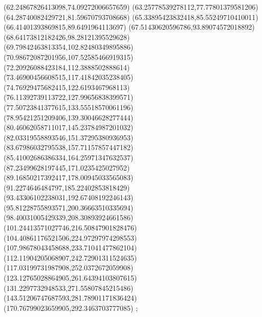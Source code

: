 {(62.24867826413098,74.09272006657659)
(63.25778539278112,77.77801379581206)
(64.28740082429721,81.59670793708668)
(65.33895423832418,85.55249710410011)
(66.41401393869815,89.6491964113697)
(67.51430620596786,93.89074572018892)
(68.64173812182426,98.28121395529628)
(69.79842463813354,102.82480349895886)
(70.98672087201956,107.52585466919315)
(72.20926088423184,112.3888502888614)
(73.46900456608515,117.41842035238405)
(74.76929475682415,122.6193467968113)
(76.11392739113722,127.99656838399571)
(77.50723841377615,133.55518570061196)
(78.95421251209406,139.30046628277444)
(80.46062058711017,145.23784987201032)
(82.03319558893546,151.37295380936953)
(83.67986032795538,157.71157857447182)
(85.41002686386334,164.25971347632537)
(87.23499628197445,171.0235425027952)
(89.16850217392417,178.00945033565083)
(91.2274646484797,185.22402853818429)
(93.43306102238031,192.67408192246143)
(95.81228755893571,200.36663510335694)
(98.40031005429339,208.30893924661586)
(101.24413571027746,216.50847901828476)
(104.40861176521506,224.97297974298553)
(107.98678043458688,233.71041477862104)
(112.11904205068907,242.72901311524635)
(117.03199731987908,252.0372672059908)
(123.12765028864905,261.64394103807615)
(131.2297732948533,271.55807845215486)
(143.51206747687593,281.78901171836424)
(170.76799023659905,292.3463703777085)
};
